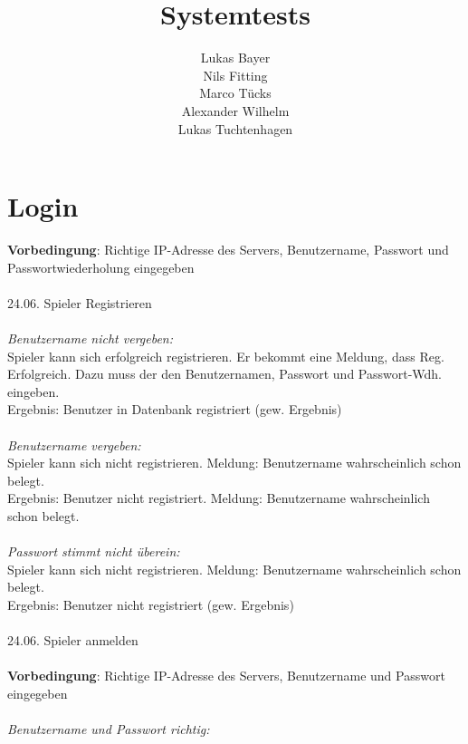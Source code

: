 \documentclass[10pt]{report}
\begin{document}
	\author{	Lukas Bayer \\
				Nils Fitting \\
 				Marco T\"ucks \\
 				Alexander Wilhelm \\
 				Lukas Tuchtenhagen
 			}
 	\title{Systemtests}
 	\maketitle
 	\tableofcontents
 	
 	\chapter{Login}
 		\textbf{Vorbedingung}: Richtige IP-Adresse des Servers, Benutzername, Passwort und 							Passwortwiederholung eingegeben \\
 		\\
 		24.06. Spieler Registrieren \\
 		\\
 		\textsl{Benutzername nicht vergeben:} \\
 		Spieler kann sich erfolgreich registrieren. Er bekommt eine Meldung, dass Reg. Erfolgreich. Dazu 			muss der den Benutzernamen, Passwort und Passwort-Wdh. eingeben.  \\
		Ergebnis: Benutzer in Datenbank registriert (gew. Ergebnis) \\
		\\
		\textsl{Benutzername vergeben:} \\
		Spieler kann sich nicht registrieren. Meldung: Benutzername wahrscheinlich schon belegt. \\
		Ergebnis: Benutzer nicht registriert. Meldung: Benutzername wahrscheinlich schon belegt. \\
		\\
		\textsl{Passwort stimmt nicht \"uberein:} \\
		Spieler kann sich nicht registrieren. Meldung: Benutzername wahrscheinlich schon belegt. \\
		Ergebnis: Benutzer nicht registriert (gew. Ergebnis) \\
		\\
		24.06. Spieler anmelden \\
		\\
		\textbf{Vorbedingung}: Richtige IP-Adresse des Servers, Benutzername und Passwort eingegeben \\
		\\
		\textsl{Benutzername und Passwort richtig:} \\
\end{document}

